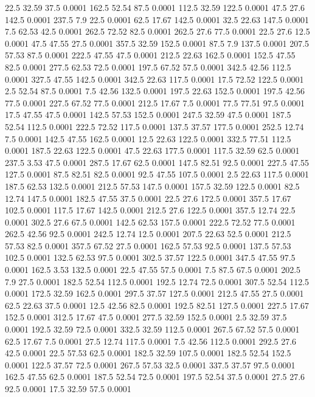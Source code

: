 22.5	32.59	37.5	0.0001
162.5	52.54	87.5	0.0001
112.5	32.59	122.5	0.0001
47.5	27.6	142.5	0.0001
237.5	7.9	22.5	0.0001
62.5	17.67	142.5	0.0001
32.5	22.63	147.5	0.0001
7.5	62.53	42.5	0.0001
262.5	72.52	82.5	0.0001
262.5	27.6	77.5	0.0001
22.5	27.6	12.5	0.0001
47.5	47.55	27.5	0.0001
357.5	32.59	152.5	0.0001
87.5	7.9	137.5	0.0001
207.5	57.53	87.5	0.0001
222.5	47.55	47.5	0.0001
212.5	22.63	162.5	0.0001
152.5	47.55	82.5	0.0001
277.5	62.53	72.5	0.0001
197.5	67.52	57.5	0.0001
342.5	42.56	112.5	0.0001
327.5	47.55	142.5	0.0001
342.5	22.63	117.5	0.0001
17.5	72.52	122.5	0.0001
2.5	52.54	87.5	0.0001
7.5	42.56	132.5	0.0001
197.5	22.63	152.5	0.0001
197.5	42.56	77.5	0.0001
227.5	67.52	77.5	0.0001
212.5	17.67	7.5	0.0001
77.5	77.51	97.5	0.0001
17.5	47.55	47.5	0.0001
142.5	57.53	152.5	0.0001
247.5	32.59	47.5	0.0001
187.5	52.54	112.5	0.0001
222.5	72.52	117.5	0.0001
137.5	37.57	177.5	0.0001
252.5	12.74	7.5	0.0001
142.5	47.55	162.5	0.0001
12.5	22.63	122.5	0.0001
332.5	77.51	112.5	0.0001
187.5	22.63	122.5	0.0001
47.5	22.63	177.5	0.0001
117.5	32.59	62.5	0.0001
237.5	3.53	47.5	0.0001
287.5	17.67	62.5	0.0001
147.5	82.51	92.5	0.0001
227.5	47.55	127.5	0.0001
87.5	82.51	82.5	0.0001
92.5	47.55	107.5	0.0001
2.5	22.63	117.5	0.0001
187.5	62.53	132.5	0.0001
212.5	57.53	147.5	0.0001
157.5	32.59	122.5	0.0001
82.5	12.74	147.5	0.0001
182.5	47.55	37.5	0.0001
22.5	27.6	172.5	0.0001
357.5	17.67	102.5	0.0001
117.5	17.67	142.5	0.0001
212.5	27.6	122.5	0.0001
357.5	12.74	22.5	0.0001
302.5	27.6	67.5	0.0001
142.5	62.53	157.5	0.0001
222.5	72.52	77.5	0.0001
262.5	42.56	92.5	0.0001
242.5	12.74	12.5	0.0001
207.5	22.63	52.5	0.0001
212.5	57.53	82.5	0.0001
357.5	67.52	27.5	0.0001
162.5	57.53	92.5	0.0001
137.5	57.53	102.5	0.0001
132.5	62.53	97.5	0.0001
302.5	37.57	122.5	0.0001
347.5	47.55	97.5	0.0001
162.5	3.53	132.5	0.0001
22.5	47.55	57.5	0.0001
7.5	87.5	67.5	0.0001
202.5	7.9	27.5	0.0001
182.5	52.54	112.5	0.0001
192.5	12.74	72.5	0.0001
307.5	52.54	112.5	0.0001
172.5	32.59	162.5	0.0001
297.5	37.57	127.5	0.0001
212.5	47.55	27.5	0.0001
62.5	22.63	37.5	0.0001
12.5	42.56	82.5	0.0001
192.5	82.51	127.5	0.0001
227.5	17.67	152.5	0.0001
312.5	17.67	47.5	0.0001
277.5	32.59	152.5	0.0001
2.5	32.59	37.5	0.0001
192.5	32.59	72.5	0.0001
332.5	32.59	112.5	0.0001
267.5	67.52	57.5	0.0001
62.5	17.67	7.5	0.0001
27.5	12.74	117.5	0.0001
7.5	42.56	112.5	0.0001
292.5	27.6	42.5	0.0001
22.5	57.53	62.5	0.0001
182.5	32.59	107.5	0.0001
182.5	52.54	152.5	0.0001
122.5	37.57	72.5	0.0001
267.5	57.53	32.5	0.0001
337.5	37.57	97.5	0.0001
162.5	47.55	62.5	0.0001
187.5	52.54	72.5	0.0001
197.5	52.54	37.5	0.0001
27.5	27.6	92.5	0.0001
17.5	32.59	57.5	0.0001
